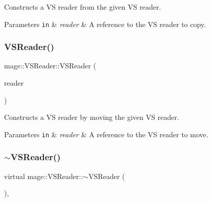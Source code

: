 Constructs a VS reader from the given VS reader.


\begin{DoxyParams}[1]{Parameters}
\mbox{\tt in}  & {\em reader} & A reference to the VS reader to copy. \\
\hline
\end{DoxyParams}
\hypertarget{classmage_1_1_v_s_reader_a84ba10ef4d308d94ea947155ab72d82a}{}\label{classmage_1_1_v_s_reader_a84ba10ef4d308d94ea947155ab72d82a} 
\subsubsection{\texorpdfstring{V\+S\+Reader()}{VSReader()}\hspace{0.1cm}{\footnotesize\ttfamily [3/3]}}
{\footnotesize\ttfamily mage\+::\+V\+S\+Reader\+::\+V\+S\+Reader (\begin{DoxyParamCaption}\item[{\hyperlink{classmage_1_1_v_s_reader}{V\+S\+Reader} \&\&}]{reader }\end{DoxyParamCaption})\hspace{0.3cm}{\ttfamily [delete]}}

Constructs a VS reader by moving the given VS reader.


\begin{DoxyParams}[1]{Parameters}
\mbox{\tt in}  & {\em reader} & A reference to the VS reader to move. \\
\hline
\end{DoxyParams}
\hypertarget{classmage_1_1_v_s_reader_adb1dc76d802501476f1af285fe22369d}{}\label{classmage_1_1_v_s_reader_adb1dc76d802501476f1af285fe22369d} 
\subsubsection{\texorpdfstring{$\sim$\+V\+S\+Reader()}{~VSReader()}}
{\footnotesize\ttfamily virtual mage\+::\+V\+S\+Reader\+::$\sim$\+V\+S\+Reader (\begin{DoxyParamCaption}{ }\end{DoxyParamCaption})\hspace{0.3cm}{\ttfamily [virtual]}, {\ttfamily [default]}}

